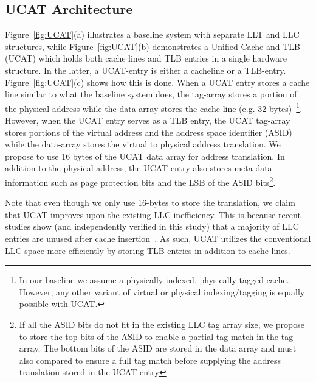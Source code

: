 
\subsection{UCAT Architecture}

\noindent Figure~\ref{fig:UCAT}(a) illustrates a baseline system with
separate LLT and LLC structures, while Figure~\ref{fig:UCAT}(b)
demonstrates a Unified Cache and TLB (UCAT) which holds both cache
lines and TLB entries in a single hardware structure. In the latter, a
UCAT-entry is either a cacheline or a TLB-entry.
Figure~\ref{fig:UCAT}(c) shows how this is done. When a UCAT entry
stores a cache line similar to what the baseline system does, the
tag-array stores a portion of the physical address while the data
array stores the cache line (e.g. 32-bytes)~\footnote{In our baseline
we assume a physically indexed, physically tagged cache. However, any
other variant of virtual or physical indexing/tagging is equally
possible with UCAT.}. However, when the UCAT entry serves as a TLB
entry, the UCAT tag-array stores portions of the virtual address and
the address space identifier (ASID) while the data-array stores the
virtual to physical address translation. We propose to use 16 bytes of
the UCAT data array for address translation. In addition to the
physical address, the UCAT-entry also stores meta-data information
such as page protection bits and the LSB of the ASID bits\footnote{If
all the ASID bits do not fit in the existing LLC tag array size, we
propose to store the top bits of the ASID to enable a partial tag
match in the tag array. The bottom bits of the ASID are stored in the
data array and must also compared to ensure a full tag match before
supplying the address translation stored in the UCAT-entry}.

Note that even though we only use 16-bytes to store the translation,
we claim that UCAT improves upon the existing LLC inefficiency. This
is because recent studies show (and independently verified in this
study) that a majority of LLC entries are unused after cache
insertion~\cite{}. As such, UCAT utilizes the conventional LLC space
more efficiently by storing TLB entries in addition to cache lines.

